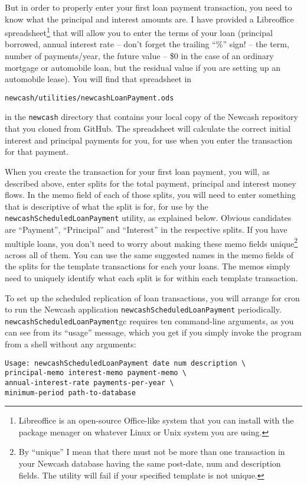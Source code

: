 \documentclass{report}
\begin{document}
But in order to properly enter your first loan payment transaction, you need to know what the principal and interest amounts are. I have provided a Libreoffice spreadsheet\footnote{Libreoffice is an open-source Office-like system that you can install with the package menager on whatever Linux or Unix system you are using.} that will allow you to enter the terms of your loan (principal borrowed, annual interest rate -- don't forget the trailing ``\%'' sign! -- the term, number of payments/year, the future value -- \$0 in the case of an ordinary mortgage or automobile loan, but the residual value if you are setting up an automobile lease). You will find that spreadsheet in 
\begin{verbatim}
newcash/utilities/newcashLoanPayment.ods
\end{verbatim}
in the \verb|newcash| directory that contains your local copy of the Newcash repository that you cloned from GitHub. The spreadsheet will calculate the correct initial interest and principal payments for you, for use when you enter the transaction for that payment.

When you create the transaction for your first loan payment, you will, as described above, enter splits for the total payment, principal and interest money flows. In the memo field of each of those splits, you will need to enter something that is descriptive of what the split is for, for use by the \verb|newcashScheduledLoanPayment| utility, as explained below. Obvious candidates are ``Payment'', ``Principal'' and ``Interest'' in the respective splits. If you have multiple loans, you don't need to worry about making these memo fields unique\footnote{By ``unique'' I mean that there must not be more than one transaction in your Newcash database having the same post-date, num and description fields. The utility will fail if your specified template is not unique.} across all of them. You can use the same suggested names in the memo fields of the splits for the template transactions for each your loans. The memos simply need to uniquely identify what each split is for within each template transaction.

To set up the scheduled replication of loan transactions, you will arrange for cron to run the Newcash application \verb|newcashScheduledLoanPayment| periodically.
\verb|newcashScheduledLoanPayment|gc requires ten command-line arguments, as you can see from its ``usage'' message, which you get if you simply invoke the program from a shell without any arguments:
\begin{verbatim}
Usage: newcashScheduledLoanPayment date num description \
principal-memo interest-memo payment-memo \
annual-interest-rate payments-per-year \
minimum-period path-to-database
\end{verbatim}
\end{document}
